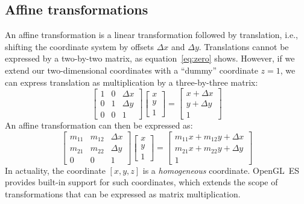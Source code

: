 \documentclass[english,12pt]{ifimaster}
\begin{document}
\subsection{Affine transformations}

An affine transformation is a linear transformation followed by
translation, i.e., shifting the coordinate system by offsets $\Delta
x$ and $\Delta y$. Translations cannot be expressed by a two-by-two
matrix, as equation~\eqref{eq:zero} shows. However, if we extend our
two-dimensional coordinates with a ``dummy'' coordinate $z = 1$, we
can express translation as multiplication by a three-by-three matrix:
\begin{equation}
  \left[\begin{matrix}
      1 & 0 & \Delta x\\
      0 & 1 & \Delta y\\
      0 & 0 & 1
    \end{matrix}\right]
  \left[\begin{matrix}
      x\\
      y\\
      1
    \end{matrix}\right]
  = \left[\begin{matrix}
      x + \Delta x\\
      y + \Delta y\\
      1
    \end{matrix}\right]
\end{equation}
An affine transformation can then be expressed as:
\begin{equation}
  \left[\begin{matrix}
      m_{11} & m_{12} & \Delta x\\
      m_{21} & m_{22} & \Delta y\\
      0 & 0 & 1
    \end{matrix}\right]
  \left[\begin{matrix}
      x\\
      y\\
      1
    \end{matrix}\right]
  = \left[\begin{matrix}
      m_{11}x + m_{12}y + \Delta x\\
      m_{21}x + m_{22}y + \Delta y\\
      1
    \end{matrix}\right]
\end{equation}
In actuality, the coordinate $[x, y, z]$ is a \emph{homogeneous}
coordinate. OpenGL~ES provides built-in support for such coordinates,
which extends the scope of transformations that can be expressed as
matrix multiplication.
\end{document}
